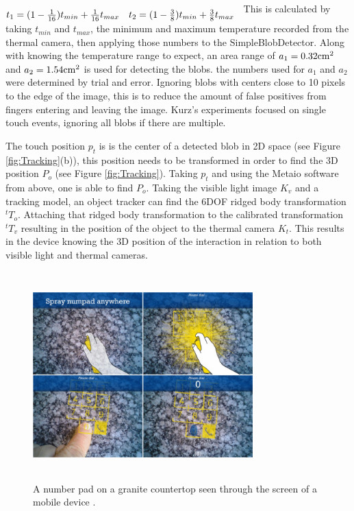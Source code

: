 \documentclass{sig-alternate}
\begin{document}
\(
\begin{matrix} \\
 t_{1}=(1-{1\over 16})t_{ min}+{1\over 16}t_{ max} & t_{2}=(1-{3\over 8})t_{ min}+{3\over 8}t_{ max}\cr 
 \end{matrix} \\\\
\)
This is calculated by taking \(t_{min}\) and \(t_{max}\), the minimum and maximum temperature recorded from the thermal camera, then applying those numbers to the SimpleBlobDetector. Along with knowing the temperature range to expect, an area range of \(a_{1}=0.32{\rm cm}^{2}\) and \(a_{2}=1.54{\rm cm}^{2}\) is used for detecting the blobs. the numbers used for \(a_{1}\) and \(a_{2}\) were determined by trial and error. Ignoring blobs with centers close to 10 pixels to the edge of the image, this is to reduce the amount of false positives from fingers entering and leaving the image. Kurz's experiments focused on single touch events, ignoring all blobs if there are multiple.

The touch position \(p_t\) is is the center of a detected blob in 2D space (see Figure \ref{fig:Tracking}(b)), this position needs to be transformed in order to find the 3D position \(P_o\) (see Figure \ref{fig:Tracking}). Taking \(p_t\) and using the Metaio software from above, one is able to find \(P_o\). Taking the visible light image \(K_v\) and a tracking model, an object tracker can find the 6DOF ridged body transformation \({^t}T_o\). Attaching that ridged body transformation to the calibrated transformation \({^t}T_v\) resulting in the position of the object to the thermal camera \(K_t\). This results in the device knowing the 3D position of the interaction in relation to both visible light and thermal cameras.
 
\begin{figure}
	\includegraphics[width=8.5cm, height=8cm]{numpad}
	\caption{A number pad on a granite countertop seen through the screen of a mobile device \cite{Thermal}.}
	\label{fig:numpad}
\end{figure}
\end{document}

